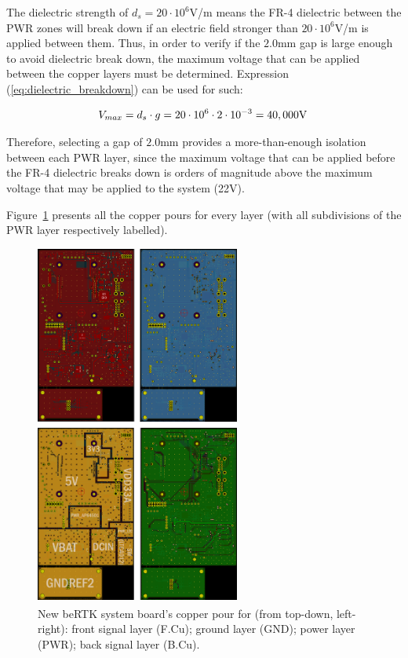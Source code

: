The dielectric strength of $d_s=20 \cdot 10^{6}$V/m means the FR-4 dielectric between the PWR zones will break down if an electric field stronger than $20 \cdot 10^{6}$V/m is applied between them. Thus, in order to verify if the $2.0$mm gap is large enough to avoid dielectric break down, the maximum voltage that can be applied between the copper layers must be determined. Expression (\ref{eq:dielectric_breakdown}) can be used for such:

\begin{equation}\label{eq:dielectric_breakdown}
	V_{max} = d_s \cdot g = 20 \cdot 10^{6} \cdot 2 \cdot 10^{-3} = 40,000 \textrm{V}\,\medskip
\end{equation}

Therefore, selecting a gap of $2.0$mm provides a more-than-enough isolation between each PWR layer, since the maximum voltage that can be applied before the FR-4 dielectric breaks down is orders of magnitude above the maximum voltage that may be applied to the system (22V).

Figure~\ref{fig:8_FCu_GND_PWR_BCu} presents all the copper pours for every layer (with all subdivisions of the PWR layer respectively labelled).

\begin{figure}[h]
	\centering
	\includegraphics[width=0.6\textwidth]{Chapters/Figures/chapter5/8_FCu_GND_PWR_BCu.png}
	\caption{New beRTK\textsuperscript{\textregistered} system board's copper pour for (from top-down, left-right): front signal layer (F.Cu); ground layer (GND); power layer (PWR); back signal layer (B.Cu).}
	\label{fig:8_FCu_GND_PWR_BCu}
\end{figure}

